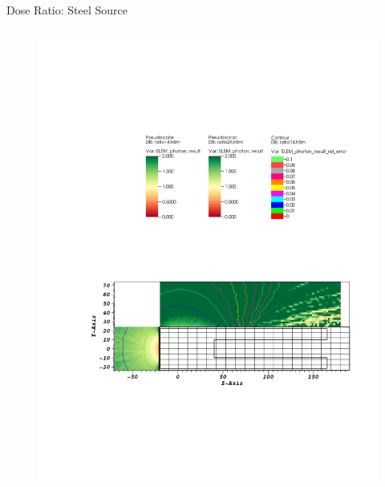 \documentclass{beamer}
\begin{document}
\begin{frame}{Dose Ratio: Steel Source}
\begin{columns}[T]

        \begin{figure}
                \centering
                \includegraphics[scale=0.49,trim={2.5cm 6cm 1cm 15cm},clip]{figs/ratio_steel_novoid.pdf}
        \end{figure}


\end{columns}
\end{frame}
\end{document}

